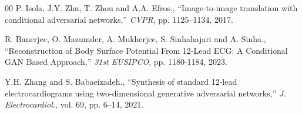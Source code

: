 \documentclass[conference]{IEEEtran}
\begin{document}
\begin{thebibliography}{00}
 P. Isola, J.Y. Zhu, T. Zhou and A.A. Efros., ``Image-to-image translation with conditional adversarial networks,'' \textit{CVPR}, pp. 1125--1134, 2017. 


  R. Banerjee,  O. Mazumder, A. Mukherjee,  S. Sinhahajari and A. Sinha., ``Reconstruction of Body Surface Potential From 12-Lead ECG: A Conditional GAN Based Approach,'' \textit{31st EUSIPCO}, pp. 1180-1184, 2023.

 Y.H. Zhang and S. Babaeizadeh., ``Synthesis of standard 12‑lead electrocardiograms using two-dimensional generative adversarial networks,'' \textit{J. Electrocardiol.}, vol. 69, pp. 6--14, 2021.

\end{thebibliography}
\end{document}
